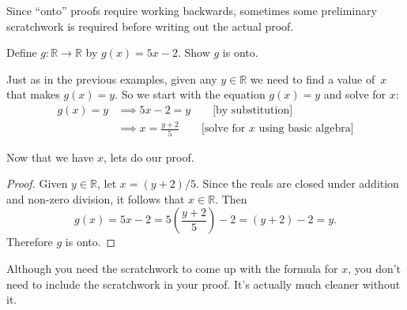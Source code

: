 % 
%

Since ``onto'' proofs require working backwards, sometimes some preliminary scratchwork is required before writing out the actual proof.

\begin{example}{}
Define $g \colon \mathbb{R} \to \mathbb{R}$ by $g(x) = 5x - 2$. Show $g$ is onto.


\begin{scratchwork}
Just as in the previous examples, given any $y \in \mathbb{R}$  we need to find a value of~$x$ that makes $g(x) = y$. So we start with the equation $g(x) = y$ and solve for $x$:
\begin{align*}
g(x) = y  &\implies 5x-2 = y \qquad \text{[by substitution]}\\
 & \implies x = \frac{y+2}{5}\qquad \text{[solve for $x$ using basic algebra]}
\end{align*}

\noindent
Now that we have $x$, lets do our proof.
\end{scratchwork}

\begin{proof} 
Given $y \in \mathbb{R}$, let $x = (y+2)/5$.  Since the reals are closed under addition and non-zero division, it follows that $x \in \mathbb{R}$. Then
\[ g(x) = 5x - 2 = 5 \left( \frac{y+2}{5} \right) - 2 = (y+2) - 2 = y . \]
Therefore $g$ is onto.
\end{proof}

\medskip
Although you need the scratchwork to come up with the formula for $x$, you don't need to include the scratchwork in your proof. It's actually much cleaner without it.
\end{example}


